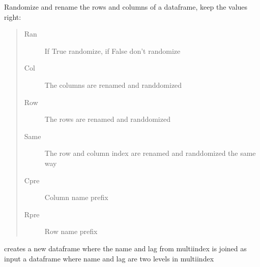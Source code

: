 \documentclass[letterpaper,10pt,english]{sphinxmanual}
\begin{document}

\begin{fulllineitems}
\label{\detokenize{core/modelclass:modelclass.randomdf}}
\pysigstartsignatures
{}
\pysigstopsignatures
\sphinxAtStartPar
Randomize and rename the rows and columns of a dataframe, keep the values right:
\begin{quote}\begin{description}
\item[{Ran}] \leavevmode
\sphinxAtStartPar
If True randomize, if False don’t randomize

\item[{Col}] \leavevmode
\sphinxAtStartPar
The columns are renamed and randdomized

\item[{Row}] \leavevmode
\sphinxAtStartPar
The rows are renamed and randdomized

\item[{Same}] \leavevmode
\sphinxAtStartPar
The row and column index are renamed and randdomized the same way

\item[{Cpre}] \leavevmode
\sphinxAtStartPar
Column name prefix

\item[{Rpre}] \leavevmode
\sphinxAtStartPar
Row name prefix

\end{description}\end{quote}

\end{fulllineitems}


\begin{fulllineitems}
\label{\detokenize{core/modelclass:modelclass.join_name_lag}}
\pysigstartsignatures
{}
\pysigstopsignatures
\sphinxAtStartPar
creates a new dataframe where  the name and lag from multiindex is joined
as input a dataframe where name and lag are two levels in multiindex

\end{fulllineitems}
\end{document}
